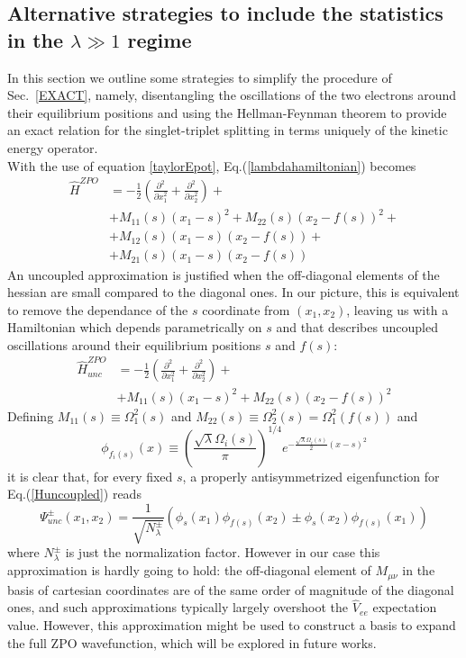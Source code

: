 \documentclass[aps,pra,twocolumn,superscriptaddress]{revtex4}
\begin{document}
\subsection{Alternative strategies to include the statistics in the $\lambda\gg 1$ regime}
In this section we outline some strategies to simplify the procedure of Sec.~\ref{EXACT}, namely, disentangling the oscillations of the two electrons around their equilibrium positions and using the Hellman-Feynman theorem to provide an exact relation for the singlet-triplet splitting in terms uniquely of the kinetic energy operator.\\
With the use of equation \ref{taylorEpot}, Eq.(\ref{lambdahamiltonian}) becomes 
\begin{equation}
\begin{aligned}
\hat{H}^{ZPO}&=-\frac{1}{2}\left(\frac{\partial^2}{\partial x_1^2}+\frac{\partial^2}{\partial x_2^2}\right)+\\&+M_{11}(s)(x_1-s)^2+M_{22}(s)(x_2-f(s))^2+\\&+M_{12}(s)(x_1-s)(x_2-f(s))+\\&+M_{21}(s)(x_1-s)(x_2-f(s))
\end{aligned}
\end{equation}
An uncoupled approximation is justified when the off-diagonal elements of the hessian are small compared to the diagonal ones. In our picture, this is equivalent to remove the dependance of the $s$ coordinate from $(x_1,x_2)$, leaving us with a Hamiltonian which depends parametrically on $s$ and that describes uncoupled oscillations around their equilibrium positions $s$ and $f(s)$:
\begin{equation}\label{Huncoupled}
\begin{aligned}
\hat{H}^{ZPO}_{unc}&=-\frac{1}{2}\left(\frac{\partial^2}{\partial x_1^2}+\frac{\partial^2}{\partial x_2^2}\right)+\\&+M_{11}(s)(x_1-s)^2+M_{22}(s)(x_2-f(s))^2
\end{aligned}
\end{equation}
Defining $M_{11}(s)\equiv \Omega_1^2(s)$ and $M_{22}(s)\equiv \Omega_2^2(s)=\Omega_1^2(f(s))$ and \begin{equation}
\phi_{f_i(s)}(x)\equiv \left(\frac{\sqrt{\lambda}\Omega_i(s)}{\pi}\right)^{1/4}e^{-\frac{\sqrt{\lambda}\Omega_i(s)}{2}(x-s)^2}
\end{equation} it is clear that, for every fixed $s$, a properly antisymmetrized eigenfunction for Eq.(\ref{Huncoupled}) reads
\begin{equation}
\Psi^\pm_{unc}(x_1,x_2)=\frac{1}{\sqrt{N_{\lambda}^\pm}}\left(\phi_{s}(x_1)\phi_{f(s)}(x_2)\pm\phi_{s}(x_2)\phi_{f(s)}(x_1)\right)
\end{equation}where $N_{\lambda}^\pm$  is just the normalization factor.
However in our case this approximation is hardly going to hold: the off-diagonal element of $M_{\mu\nu}$ in the basis of cartesian coordinates are of the same order of magnitude  of the diagonal ones, and such approximations typically largely overshoot the $\hat{V}_{ee}$  expectation value. However, this approximation might be used to construct a basis to expand the full ZPO wavefunction, which will be explored in future works.\\
\end{document}
